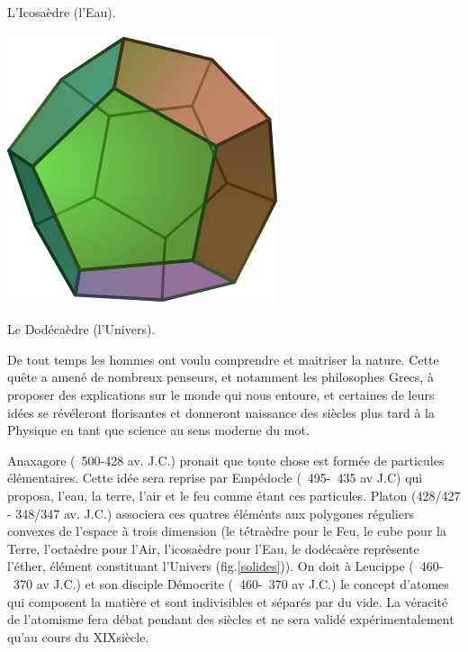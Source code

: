 {\begin{center}
\vspace*{-0.25cm}
\begin{center}\normalfont\small {L'Icosaèdre (l'Eau).}\end{center}
\vspace*{-0.25cm}
\includegraphics[width=0.25\marginparwidth]{SM/Dodecahedron.png}
\vspace*{-0.25cm}
\begin{center}\normalfont\small {Le Dodécaèdre (l'Univers).}\end{center}
\vspace*{-0.25cm}
\label{solides}
\end{center}
}
De tout temps les hommes ont voulu comprendre et maitriser la nature. Cette quête a amené de nombreux penseurs, et notamment les philosophes Grecs, à proposer des explications sur le monde qui nous entoure, et certaines de leurs idées se révéleront florisantes et donneront naissance des siècles plus tard à la Physique en tant que science au sens moderne du mot. 

Anaxagore (~500-428 av. J.C.) pronait que toute chose est formée de particules élémentaires. Cette idée sera reprise par Empédocle (~495-~435 av J.C) qui proposa, l'eau, la terre, l'air et le feu comme étant ces particules. Platon (428/427 - 348/347 av. J.C.) associera ces quatres éléménts aux polygones réguliers convexes de l'espace à trois dimension (le tétraèdre pour le Feu, le cube pour la Terre, l'octaèdre pour l'Air, l'icosaèdre pour l'Eau, le dodécaère reprèsente l'éther, élément constituant l'Univers (fig.\ref{solides})). On doit à Leucippe (~460-~370 av J.C.) et son disciple Démocrite (~460-~370 av J.C.) le concept d'atomes qui composent la matière et sont indivisibles et séparés par du vide. La véracité de l'atomisme fera débat pendant des siècles et ne sera validé expérimentalement qu'au cours du XIX\ieme siècle.

